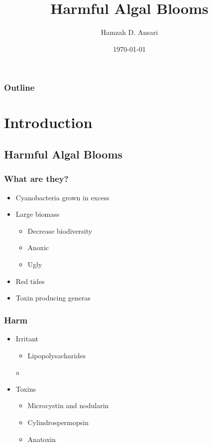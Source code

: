 \documentclass{beamer}
\title{Harmful Algal Blooms}
\author{Hamzah D. Ansari}
\institute{Oakland University}
\date{\today}
\begin{document}
\begin{frame} 
\titlepage
\end{frame}

\begin{frame}
	\frametitle{Outline}

	\tableofcontents

\end{frame}

\section{Introduction}
\subsection{Harmful Algal Blooms}
\begin{frame}
	\frametitle{What are they?}

	\begin{itemize}
		\item Cyanobacteria grown in excess
		\item Large biomass
			\begin{itemize}
			\item Decrease biodiversity
			\item Anoxic
			\item Ugly
		\end{itemize}

	\item Red tides
	\item Toxin producing generas
	
	\end{itemize}

	

\end{frame}

\begin{frame}
	\frametitle{Harm}

	\begin{itemize}
		\item Irritant
			\begin{itemize}
				\item Lipopolysacharides
			\end{itemize}a
		\item Toxins
			\begin{itemize}
				\item Microcystin and nodularin
				\item Cylindrospermopsin
				\item Anatoxin
			\end{itemize}
		
	\end{itemize}
\end{frame}
\end{document}
